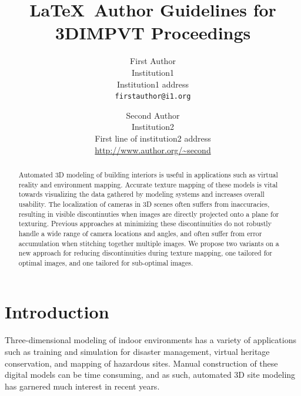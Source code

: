 \documentclass[10pt,twocolumn,letterpaper]{article}
\begin{document}
\title{\LaTeX\ Author Guidelines for 3DIMPVT Proceedings}

\author{First Author\\
  Institution1\\
  Institution1 address\\
  {\tt\small firstauthor@i1.org}
  \and
  Second Author\\
  Institution2\\
  First line of institution2 address\\
  {\small\url{http://www.author.org/~second}} }

\maketitle

\begin{abstract}
  Automated 3D modeling of building interiors is useful in applications
  such as virtual reality and environment mapping. Accurate texture
  mapping of these models is vital towards visualizing the data
  gathered by modeling systems and increases overall usability. The
  localization of cameras in 3D scenes often suffers from inaccuracies, resulting in visible discontinuties
  when images are directly projected onto a plane for
  texturing. Previous approaches at minimizing these discontinuities
  do not robustly handle a wide range of camera locations and angles, and often suffer from error accumulation when stitching together multiple
  images. We propose two variants on a new approach for reducing discontinuities
  during texture mapping, one tailored for optimal images, and one tailored for sub-optimal images.
\end{abstract}

\section{Introduction}
Three-dimensional modeling of indoor environments has a variety of
applications such as training and simulation for disaster management,
virtual heritage conservation, and mapping of hazardous sites. Manual
construction of these digital models can be time consuming, and as
such, automated 3D site modeling has garnered much interest in recent
years.
\end{document}
